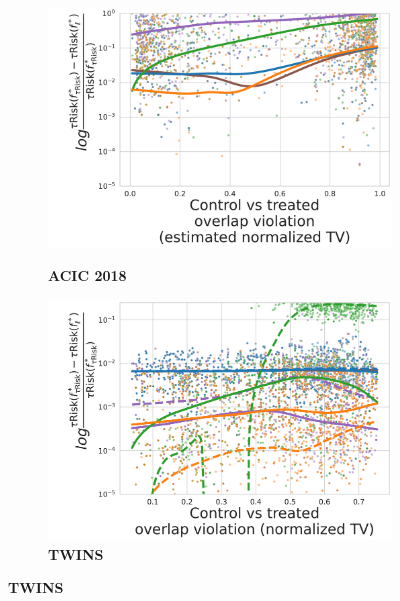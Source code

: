 \documentclass[unnumsec,webpdf,contemporary,large]{oup-authoring-template}%
\theoremstyle{thmstyleone}%
\theoremstyle{thmstyletwo}%
\theoremstyle{thmstylethree}%
\begin{document}
\begin{appendices}
\begin{figure}
\begin{subfigure}[b]{0.10\textwidth}
        \end{subfigure}
        \begin{subfigure}[b]{0.44\textwidth}
            \centering
            \caption{\textbf{ACIC 2018}}
            \includegraphics[width=\textwidth]{normalized_bias_tau_risk_to_best_method_acic_2018__nuisance_stacking__candidates_hist_gradient_boosting__tset_50.pdf}
            \label{fig:normalized_bias_tau_risk_to_best_method_acic_2018}
        \end{subfigure}
        \hfill
        \begin{subfigure}[b]{0.44\textwidth}
            \centering
            \caption{\textbf{TWINS}}
            \includegraphics[width=\textwidth]{normalized_bias_tau_risk_to_best_method_twins__nuisance_stacking__candidates_hist_gradient_boosting__tset_50__overlap_11-296__rs_0-9_noise10.pdf}

\end{subfigure}
\end{figure}
\end{appendices}
\end{document}
